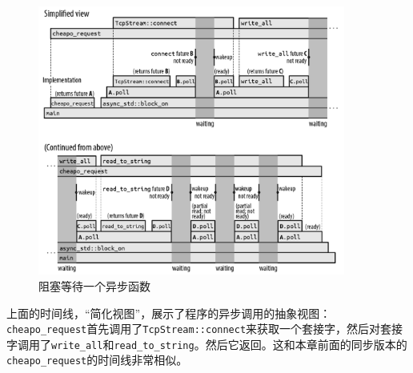\begin{figure}[htbp]
    \centering
    \includegraphics[width=0.9\textwidth]{../img/f20-2.png}
    \caption{阻塞等待一个异步函数}
    \label{f20-2}
\end{figure}

上面的时间线，“简化视图”，展示了程序的异步调用的抽象视图：\texttt{cheapo\_request}首先调用了\texttt{TcpStream::connect}来获取一个套接字，然后对套接字调用了\texttt{write\_all}和\texttt{read\_to\_string}。然后它返回。这和本章前面的同步版本的\texttt{cheapo\_request}的时间线非常相似。

